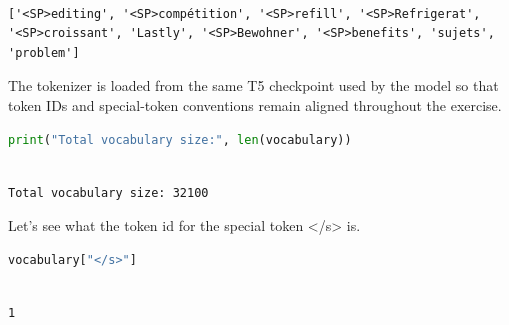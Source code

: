 \documentclass[../labs.tex]{subfiles}
\begin{document}
\hypertarget{res:lab02-text-01-t5-ipynb-10-78eb8e59a7f8}{}

\begin{lstlisting}[basicstyle=\ttfamily\scriptsize,breaklines=true,breakatwhitespace=false,columns=fullflexible,keepspaces=true]

['<SP>editing', '<SP>compétition', '<SP>refill', '<SP>Refrigerat', '<SP>croissant', 'Lastly', '<SP>Bewohner', '<SP>benefits', 'sujets', 'problem']

\end{lstlisting}



\noindent The tokenizer is loaded from the same T5 checkpoint used by the model so that token IDs and special-token conventions remain aligned throughout the exercise.

\begin{lstlisting}[language=Python,basicstyle=\ttfamily\scriptsize,breaklines=true,breakatwhitespace=false,columns=fullflexible,keepspaces=true,numbers=none]
print("Total vocabulary size:", len(vocabulary))
\end{lstlisting}

\hypertarget{res:lab02-text-01-t5-ipynb-11-5ddd06561c4b}{}

\begin{lstlisting}[basicstyle=\ttfamily\scriptsize,breaklines=true,breakatwhitespace=false,columns=fullflexible,keepspaces=true]

Total vocabulary size: 32100

\end{lstlisting}



\noindent Let's see what the token id for the special token </s> is.

\begin{lstlisting}[language=Python,basicstyle=\ttfamily\scriptsize,breaklines=true,breakatwhitespace=false,columns=fullflexible,keepspaces=true,numbers=none]
vocabulary["</s>"]
\end{lstlisting}

\hypertarget{res:lab02-text-01-t5-ipynb-14-c30252f4942b}{}

\begin{lstlisting}[basicstyle=\ttfamily\scriptsize,breaklines=true,breakatwhitespace=false,columns=fullflexible,keepspaces=true]

1

\end{lstlisting}
\end{document}
